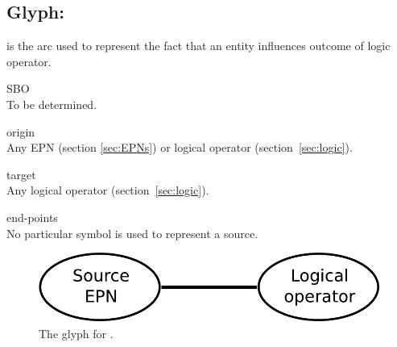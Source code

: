 \subsection{Glyph:  }\label{sec:logicArc}

 is the arc used to represent the fact that an entity influences
outcome of logic operator. 

\begin{glyphDescription}
 \item[SBO]\mbox{}\\ To be determined.
 \item[origin]\mbox{}\\ Any EPN (section \ref{sec:EPNs}) or logical operator (section~\ref{sec:logic}).
 \item[target]\mbox{}\\ Any logical operator (section~\ref{sec:logic}).
 \item[end-points]\mbox{}\\ No particular symbol is used to represent a source.
 \end{glyphDescription}

\begin{figure}[H]
  \centering
  \includegraphics[scale = 0.5]{images/logicArc}
  \caption{The \PD glyph for .}
  \label{fig:logicArc}
\end{figure}
